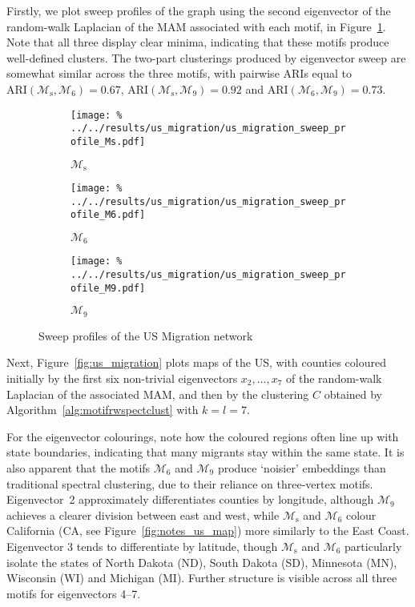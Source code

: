\documentclass[12pt]{ociamthesis}
\theoremstyle{plain}
\theoremstyle{definition}
\theoremstyle{remark}
\newcommand\ca[1]{\mathcal{#1}}
\begin{document}
Firstly, we plot sweep profiles of the graph using the second eigenvector of
the random-walk Laplacian of the MAM associated with each motif, in
Figure~\ref{fig:migration_sweep}. Note that all three display clear minima,
indicating that these motifs produce well-defined clusters. The two-part
clusterings produced by eigenvector sweep are somewhat similar across the three
motifs, with pairwise ARIs equal to $\textrm{ARI}(\ca{M}_\mathrm{s}, \ca{M}_6)
= 0.67$, $\textrm{ARI}(\ca{M}_\mathrm{s}, \ca{M}_9) = 0.92$ and
$\textrm{ARI}(\ca{M}_6, \ca{M}_9) = 0.73$.

\begin{figure}[H]
\begin{subfigure}{.325\textwidth}
\centering
\texttt{[image: \%
../../results/us\_migration/us\_migration\_sweep\_profile\_Ms.pdf]}
\caption{$\ca{M}_\mathrm{s}$}
\end{subfigure}
\begin{subfigure}{.325\textwidth}
\centering
\texttt{[image: \%
../../results/us\_migration/us\_migration\_sweep\_profile\_M6.pdf]}
\caption{$\ca{M}_6$}
\end{subfigure}
\begin{subfigure}{.325\textwidth}
\centering
\texttt{[image: \%
../../results/us\_migration/us\_migration\_sweep\_profile\_M9.pdf]}
\caption{$\ca{M}_9$}
\end{subfigure}
\caption{Sweep profiles of the US Migration network}
\label{fig:migration_sweep}
\end{figure}

Next, Figure~\ref{fig:us_migration} plots maps of the US, with counties
coloured initially by the first six non-trivial eigenvectors $x_2, \ldots, x_7$
of the random-walk Laplacian of the associated MAM, and then by the clustering
$C$ obtained by Algorithm~\ref{alg:motifrwspectclust} with $k=l=7$.

For the eigenvector colourings, note how the coloured regions often line up
with state boundaries, indicating that many migrants stay within the same
state.
It is also apparent that the motifs $\ca{M}_6$ and $\ca{M}_9$ produce `noisier'
embeddings than traditional spectral clustering, due to their reliance on
three-vertex motifs.
Eigenvector~2 approximately differentiates counties by longitude, although
$\ca{M}_9$ achieves a clearer division between east and west, while
$\ca{M}_\mathrm{s}$ and $\ca{M}_6$ colour California (CA, see
Figure~\ref{fig:notes_us_map}) more similarly to the East Coast.
Eigenvector 3 tends to differentiate by latitude, though $\ca{M}_\mathrm{s}$
and $\ca{M}_6$ particularly isolate the states of North Dakota (ND), South
Dakota (SD), Minnesota (MN), Wisconsin (WI) and Michigan (MI).
Further structure is visible across all three motifs for eigenvectors 4--7.
\end{document}
